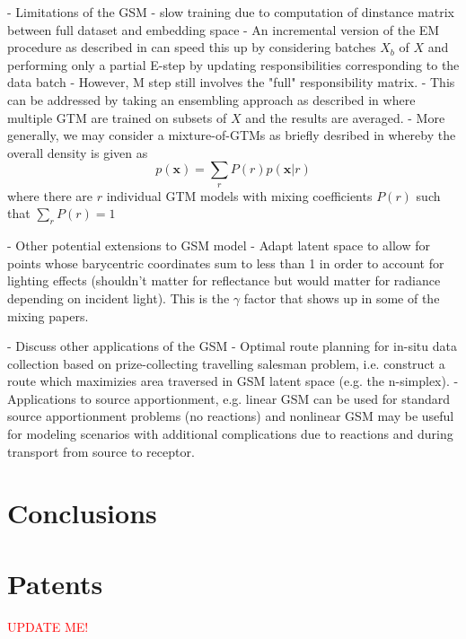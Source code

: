 \documentclass[remotesensing,article,submit,pdftex,moreauthors]{Definitions/mdpi}
\begin{document}
- Limitations of the GSM
    - slow training due to computation of dinstance matrix between full dataset and embedding space
    - An incremental version of the EM procedure as described in \cite{gtm-developments} can speed this up by considering batches $X_b$ of $X$ and performing only a partial E-step by updating responsibilities corresponding to the data batch
    - However, M step still involves the "full" responsibility matrix. 
    - This can be addressed by taking an ensembling approach as described in \cite{parallel-gtm} where multiple GTM are trained on subsets of $X$ and the results are averaged. 
    - More generally, we may consider a mixture-of-GTMs as briefly desribed in \cite{gtm-orig} whereby the overall density is given as 
    \begin{equation}
        p(\mathbf{x}) = \sum_r P(r)p(\mathbf{x}\vert r)
    \end{equation}
    where there are $r$ individual GTM models with mixing coefficients $P(r)$ such that $\sum_r P(r) =1$

- Other potential extensions to GSM model
     - Adapt latent space  to allow for points whose barycentric coordinates sum to less than 1 in order to account for lighting effects (shouldn't matter for reflectance but would matter for radiance depending on incident light). This is the $\gamma$ factor that shows up in some of the mixing papers.

- Discuss other applications of the GSM
    - Optimal route planning for in-situ data collection based on prize-collecting travelling salesman problem, i.e. construct a route which maximizies area traversed in GSM latent space (e.g. the n-simplex). 
    - Applications to source apportionment, e.g. linear GSM can be used for standard source apportionment problems (no reactions) and nonlinear GSM may be useful for modeling scenarios with additional complications due to reactions and during transport from source to receptor.

\section{Conclusions}\label{sec:conclusions}


\section{Patents}

\textcolor{red}{UPDATE ME!}

\vspace{6pt} 
\end{document}

